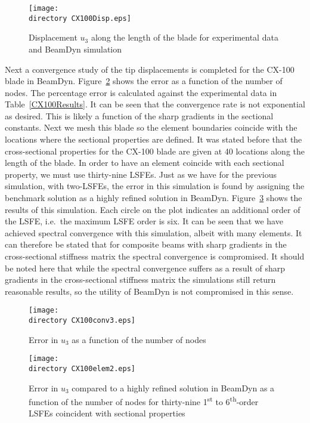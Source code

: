 \documentclass{aiaa-tc}
\def\directory{EPSF/}
\begin{document}
\begin{figure}
\centering
\texttt{[image: \\directory CX100Disp.eps]}
\caption{Displacement $u_3$ along the length of the blade for experimental data and BeamDyn simulation} 
\label{CX100Disp}
\end{figure}

Next a convergence study of the tip displacements is completed for the CX-100 blade in BeamDyn. Figure~\ref{CX100conv3} shows the error as a function of the number of nodes. The percentage error is calculated against the experimental data in Table~\ref{CX100Results}. It can be seen that the convergence rate is not exponential as desired. This is likely a function of the sharp gradients in the sectional constants. Next we mesh this blade so the element boundaries coincide with the locations where the sectional properties are defined. It was stated before that the cross-sectional properties for the CX-100 blade are given at 40 locations along the length of the blade. In order to have an element coincide with each sectional property, we must use thirty-nine LSFEs. Just as we have for the previous simulation, with two-LSFEs, the error in this simulation is found by assigning the benchmark solution as a highly refined solution in BeamDyn. Figure~\ref{CX100elem2} shows the results of this simulation. Each circle on the plot indicates an additional order of the LSFE, i.e.\ the maximum LSFE order is six. It can be seen that we have achieved spectral convergence with this simulation, albeit with many elements. It can therefore be stated that for composite beams with sharp gradients in the cross-sectional stiffness matrix the spectral convergence is compromised. It should be noted here that while the spectral convergence suffers as a result of sharp gradients in the cross-sectional stiffness matrix the simulations still return reasonable results, so the utility of BeamDyn is not compromised in this sense.
  

\begin{figure}
\centering
\texttt{[image: \\directory CX100conv3.eps]}
\caption{Error in $u_3$ as a function of the number of nodes} 
\label{CX100conv3}
\end{figure}

\begin{figure}
\centering
\texttt{[image: \\directory CX100elem2.eps]}
\caption{Error in $u_3$ compared to a highly refined solution in BeamDyn as a function of the number of nodes for thirty-nine 1\textsuperscript{st} to 6\textsuperscript{th}-order LSFEs coincident with sectional properties} 
\label{CX100elem2}
\end{figure}
\end{document}

